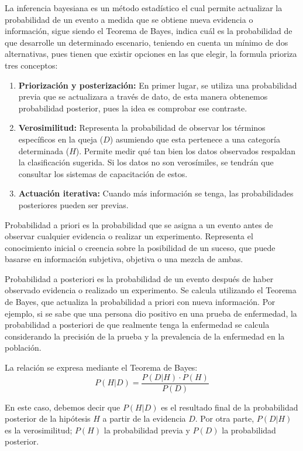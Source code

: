 La inferencia bayesiana es un método estadístico el cual permite actualizar la probabilidad de un evento a medida que se obtiene nueva evidencia o información, sigue siendo el Teorema de Bayes, indica cuál es la probabilidad de que desarrolle un determinado escenario, teniendo en cuenta un mínimo de dos alternativas, pues tienen que existir opciones en las que elegir, la formula prioriza tres conceptos:

\begin{enumerate}
    \item \textbf{Priorización y posterización:} En primer lugar, se utiliza una probabilidad previa que se actualizara a través de dato, de esta manera obtenemos probabilidad posterior, pues la idea es comprobar ese contraste.
    \item \textbf{Verosimilitud:} Representa la probabilidad de observar los términos específicos en la queja ($D$) asumiendo que esta pertenece a una categoría determinada ($H$). Permite medir qué tan bien los datos observados respaldan la clasificación sugerida. Si los datos no son verosímiles, se tendrán que consultar los sistemas de capacitación de estos.
    \item \textbf{Actuación iterativa:} Cuando más información se tenga, las probabilidades posteriores pueden ser previas.
\end{enumerate}

Probabilidad a priori es la probabilidad que se asigna a un evento antes de observar cualquier evidencia o realizar un experimento. Representa el conocimiento inicial o creencia sobre la posibilidad de un suceso, que puede basarse en información subjetiva, objetiva o una mezcla de ambas.

Probabilidad a posteriori es la probabilidad de un evento después de haber observado evidencia o realizado un experimento. Se calcula utilizando el Teorema de Bayes, que actualiza la probabilidad a priori con nueva información. Por ejemplo, si se sabe que una persona dio positivo en una prueba de enfermedad, la probabilidad a posteriori de que realmente tenga la enfermedad se calcula considerando la precisión de la prueba y la prevalencia de la enfermedad en la población.

La relación se expresa mediante el Teorema de Bayes:
\begin{equation}
P(H|D) = \frac{P(D|H) \cdot P(H)}{P(D)}
\end{equation}

En este caso, debemos decir que $P(H|D)$ es el resultado final de la probabilidad posterior de la hipótesis $H$ a partir de la evidencia $D$. Por otra parte, $P(D|H)$ es la verosimilitud; $P(H)$ la probabilidad previa y $P(D)$ la probabilidad posterior.

